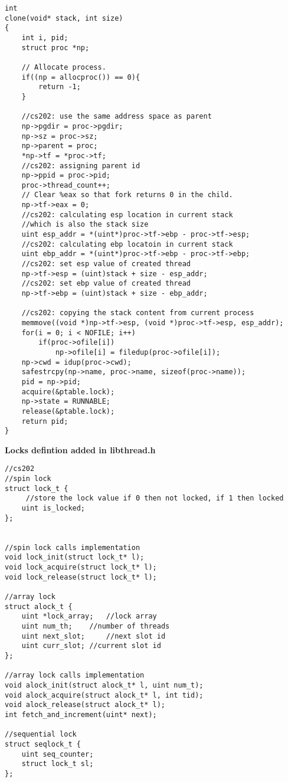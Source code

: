\documentclass[a4paper, 11pt]{article}
\begin{document}
\begin{itemize}
\begin{lstlisting}
int
clone(void* stack, int size)
{
    int i, pid;
    struct proc *np;
    
    // Allocate process.
    if((np = allocproc()) == 0){
        return -1;
    }

    //cs202: use the same address space as parent
    np->pgdir = proc->pgdir;
    np->sz = proc->sz;
    np->parent = proc;
    *np->tf = *proc->tf;
    //cs202: assigning parent id
    np->ppid = proc->pid;
    proc->thread_count++;
    // Clear %eax so that fork returns 0 in the child.
    np->tf->eax = 0;
    //cs202: calculating esp location in current stack
    //which is also the stack size
    uint esp_addr = *(uint*)proc->tf->ebp - proc->tf->esp;
    //cs202: calculating ebp locatoin in current stack
    uint ebp_addr = *(uint*)proc->tf->ebp - proc->tf->ebp;
    //cs202: set esp value of created thread 
    np->tf->esp = (uint)stack + size - esp_addr;
    //cs202: set ebp value of created thread
    np->tf->ebp = (uint)stack + size - ebp_addr;

    //cs202: copying the stack content from current process
    memmove((void *)np->tf->esp, (void *)proc->tf->esp, esp_addr);
    for(i = 0; i < NOFILE; i++)
        if(proc->ofile[i])
            np->ofile[i] = filedup(proc->ofile[i]);
    np->cwd = idup(proc->cwd);
    safestrcpy(np->name, proc->name, sizeof(proc->name));
    pid = np->pid;
    acquire(&ptable.lock);
    np->state = RUNNABLE;
    release(&ptable.lock);
    return pid;
}
\end{lstlisting}

\textbf{Locks defintion added in libthread.h}
\begin{lstlisting}
//cs202
//spin lock
struct lock_t {
     //store the lock value if 0 then not locked, if 1 then locked
    uint is_locked;
};


//spin lock calls implementation
void lock_init(struct lock_t* l);
void lock_acquire(struct lock_t* l);
void lock_release(struct lock_t* l);

//array lock
struct alock_t {
    uint *lock_array; 	//lock array
    uint num_th; 	//number of threads
    uint next_slot; 	//next slot id
    uint curr_slot;	//current slot id
};

//array lock calls implementation
void alock_init(struct alock_t* l, uint num_t);
void alock_acquire(struct alock_t* l, int tid);
void alock_release(struct alock_t* l);
int fetch_and_increment(uint* next);

//sequential lock
struct seqlock_t {
    uint seq_counter;
    struct lock_t sl;
};


\end{lstlisting}
\end{itemize}
\end{document}
